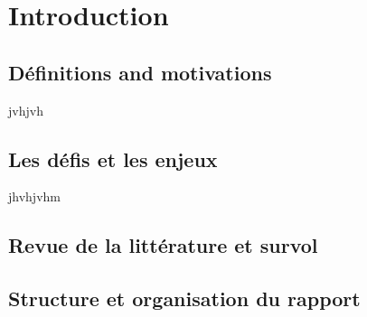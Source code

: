 

\section{Introduction}
\subsection{Définitions and motivations}
jvhjvh

\subsection{Les défis et les enjeux}
jhvhjvhm
\subsection{Revue de la littérature et survol}
\subsection{Structure et organisation du rapport}
